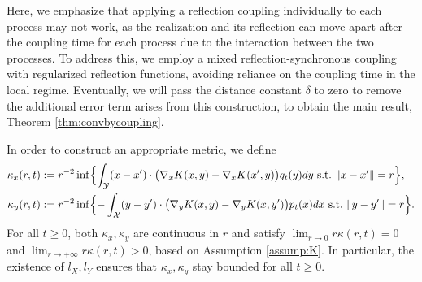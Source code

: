 \documentclass[11pt]{article}
\newcommand{\1}{\mathds{1}}
\begin{document}
Here, we emphasize that applying a reflection coupling individually to each process may not work, as the realization and its reflection can move apart after the coupling time for each process due to the interaction between the two processes. To address this, we employ a mixed reflection-synchronous coupling with regularized reflection functions, avoiding reliance on the coupling time in the local regime. Eventually, we will pass the distance constant $\delta$ to zero to remove the additional error term arises from this construction, to obtain the main result, Theorem \ref{thm:convbycoupling}.

In order to construct an appropriate metric, we define 
\begin{equation}\label{def:kappa}
    \begin{aligned}
        \kappa_x(r,t) &:= r^{-2} \inf\Bigl\{\int_{\mathcal{Y}}(x-x')\cdot \bigl(\nabla_x K(x, y)- \nabla_x K(x', y)\bigr) q_t(y)dy ~\text{s.t.}~\|x-x'\|=r\Bigr\},\\
         \kappa_y(r,t) &:= r^{-2} \inf\Bigl\{-\int_{\mathcal{X}}(y-y')\cdot \bigl(\nabla_y K(x, y)- \nabla_y K(x, y')\bigr) p_t(x)dx ~\text{s.t.}~\|y-y'\|=r\Bigr\}.
    \end{aligned}
\end{equation}
For all $t\geq 0$, both $\kappa_x, \kappa_y$ are continuous in $r$ and satisfy $\lim_{r\to 0} r \kappa(r,t) = 0$ and $\lim_{r\to +\infty} r \kappa(r,t) >0$, based on Assumption \ref{assump:K}. In particular, the existence of $l_X, l_Y$ ensures that $\kappa_x, \kappa_y$ stay bounded for all  $t\geq 0$.
\end{document}

